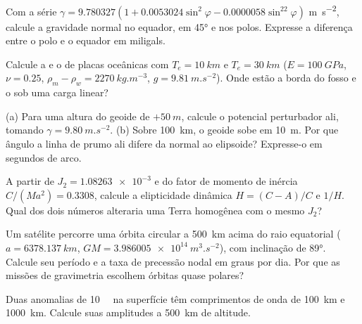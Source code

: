 \begin{exercise}[$\star$]\label{exo:b3:gravity-geodesy:3}
Com a série $\gamma = 9.780327(1 + 0.0053024\sin^2\varphi -
0.0000058\sin^22\varphi)$ \unit{m.s^{-2}}, calcule a gravidade normal no
equador, em \ang{45} e nos polos. Expresse a diferença entre o polo
e o equador em miligals.
\end{exercise}

\begin{exercise}[$\star$]\label{exo:b3:gravity-geodesy:4}
Calcule a  e o  de placas oceânicas com
$T_e = \qty{10}{km}$ e $T_e = \qty{30}{km}$ ($E = \qty{100}{GPa}$,
$\nu = 0.25$, $\rho_m - \rho_w = \qty{2270}{kg.m^{-3}}$, $g =
\qty{9.81}{m.s^{-2}}$). Onde estão a borda do fosso e o  sob uma
carga linear?
\end{exercise}

\begin{exercise}[$\star\star$]\label{exo:b3:gravity-geodesy:5}
(a) Para uma altura do geoide de $+\qty{50}{m}$, calcule o potencial perturbador ali,
tomando $\gamma = \qty{9.80}{m.s^{-2}}$. (b) Sobre \qty{100}{km}, o geoide sobe
em \qty{10}{m}. Por que ângulo a linha de prumo ali difere da normal ao
elipsoide? Expresse-o em segundos de arco.
\end{exercise}

\begin{exercise}[$\star\star$]\label{exo:b3:gravity-geodesy:6}
A partir de $J_2 = \num{1.08263e-3}$ e do fator de momento de inércia
$C/(Ma^2) = \num{0.3308}$, calcule a elipticidade dinâmica $H = (C - A)/C$ e
$1/H$. Qual dos dois números alteraria uma Terra homogênea com o mesmo $J_2$?
\end{exercise}

\begin{exercise}[$\star\star$]\label{exo:b3:gravity-geodesy:7}
Um satélite percorre uma órbita circular a \qty{500}{km} acima do raio equatorial
($a = \qty{6378.137}{km}$, $GM = \qty{3.986005e14}{m^3.s^{-2}}$), com inclinação de
\ang{89}. Calcule seu período e a taxa de precessão nodal em graus por dia.
Por que as missões de gravimetria escolhem órbitas quase polares?
\end{exercise}

\begin{exercise}[$\star\star$]\label{exo:b3:gravity-geodesy:8}
Duas anomalias de \qty{10}{\milli\gal} na superfície têm comprimentos de onda de
\qty{100}{km} e \qty{1000}{km}. Calcule suas amplitudes a
\qty{500}{km} de altitude.
\end{exercise}

